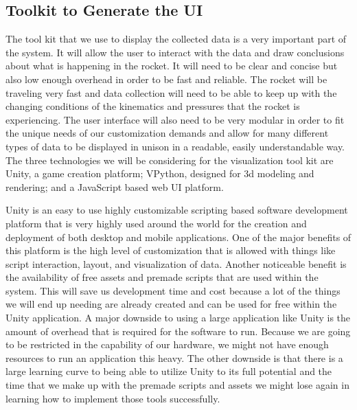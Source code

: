 \documentclass[10pt,draftclsnofoot,onecolumn,retainorgcmds]{IEEEtran}
\begin{document}
\subsection{Toolkit to Generate the UI}
The tool kit that we use to display the collected data is a very important part of the system. It will allow the user to interact with the data and draw conclusions about what is happening in the rocket. It will need to be clear and concise but also low enough overhead in order to be fast and reliable. The rocket will be traveling very fast and data collection will need to be able to keep up with the changing conditions of the kinematics and pressures that the rocket is experiencing. The user interface will also need to be very modular in order to fit the unique needs of our customization demands and allow for many different types of data to be displayed in unison in a readable, easily understandable way. The three technologies we will be considering for the visualization tool kit are Unity, a game creation platform; VPython, designed for 3d modeling and rendering; and a JavaScript based web UI platform. \par

Unity is an easy to use highly customizable scripting based software development platform that is very highly used around the world for the creation and deployment of both desktop and mobile applications. One of the major benefits of this platform is the high level of customization that is allowed with things like script interaction, layout, and visualization of data. Another noticeable benefit is the availability of free assets and premade scripts that are used within the system. This will save us development time and cost because a lot of the things we will end up needing are already created and can be used for free within the Unity application. A major downside to using a large application like Unity is the amount of overhead that is required for the software to run. Because we are going to be restricted in the capability of our hardware, we might not have enough resources to run an application this heavy. The other downside is that there is a large learning curve to being able to utilize Unity to its full potential and the time that we make up with the premade scripts and assets we might lose again in learning how to implement those tools successfully. \par
\end{document}
